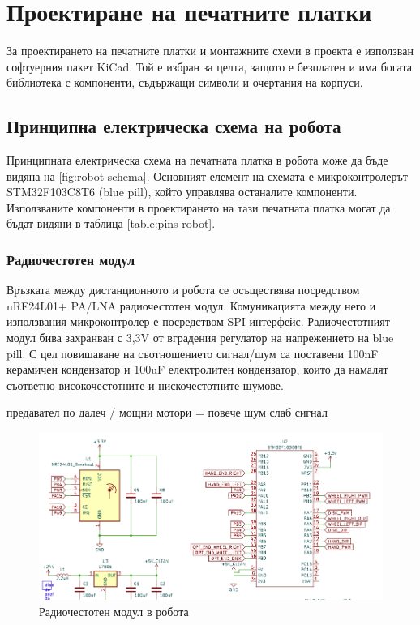 \chapter{Проектиране на печатните платки}

За проектирането на печатните платки и монтажните схеми в проекта е използван софтуерния пакет KiCad. Той е избран за целта, защото е безплатен и има богата библиотека с компоненти, съдържащи символи и очертания на корпуси.


\section{Принципна електрическа схема на робота}

Принципната електрическа схема на печатната платка в робота може да бъде видяна на \cref{fig:robot-schema}. Основният елемент на схемата е микроконтролерът STM32F103C8T6 (blue pill), който управлява останалите компоненти. Използваните компоненти в проектирането на тази печатната платка могат да бъдат видяни в таблица \cref{table:pins-robot}.



\subsection{Радиочестотен модул}
\label{ssec:rf-module-robot}

Връзката между дистанционното и робота се осъществява посредством nRF24L01+ PA/LNA радиочестотен модул. Комуникацията между него и използвания микроконтролер е посредством SPI интерфейс. Радиочестотният модул бива захранван с 3,3V от вградения регулатор на напрежението на blue pill. С цел повишаване на съотношението сигнал/шум са поставени 100nF керамичен кондензатор и 100uF електролитен кондензатор, които да намалят съответно високочестотните и нискочестотните шумове.

предавател по далеч / мощни мотори = повече шум
слаб сигнал

\begin{figure}[H]
    \centering
    \includegraphics[width=0.6\linewidth]{images/rf-module.png}
    
    \caption{Радиочестотен модул в робота}
    \label{fig:rf-module-robot} 
\end{figure}



